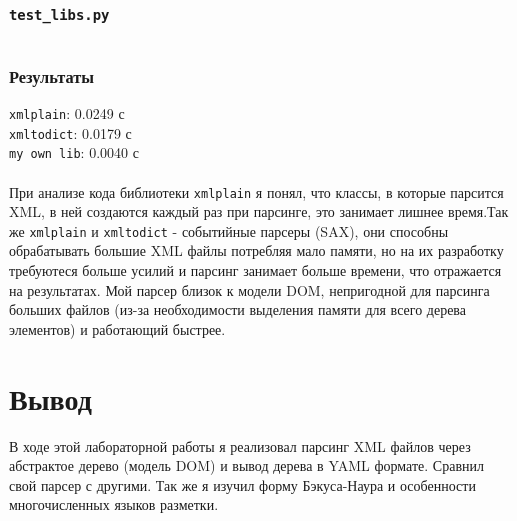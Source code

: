 \documentclass[11pt]{article}
\begin{document}
\subsubsection{ \texttt{test\_libs.py}}
\inputminted{python}{../test_libs.py}
\subsubsection{ Результаты}
\texttt{xmlplain}:  0.0249 с\\
\texttt{xmltodict}:  0.0179 с\\
\texttt{my own lib}:  0.0040 с\\\\
При анализе кода библиотеки \texttt{xmlplain} я понял, что классы, в которые парсится XML, в ней создаются каждый раз при парсинге, это занимает лишнее время.Так же \texttt{xmlplain} и \texttt{xmltodict} - событийные парсеры (SAX), они способны обрабатывать большие XML файлы потребляя мало памяти, но на их разработку требуютеся больше усилий и парсинг занимает больше времени, что отражается на результатах. Мой парсер близок к модели DOM, непригодной для парсинга больших файлов (из-за необходимости выделения памяти для всего дерева элементов) и работающий быстрее.
\section{Вывод}
\large
В ходе этой лабораторной работы я реализовал парсинг XML файлов через абстрактое дерево (модель DOM) и вывод дерева в YAML  формате. Сравнил свой парсер с другими. Так же я изучил форму  Бэкуса-Наура и особенности многочисленных языков разметки.
\end{document}
